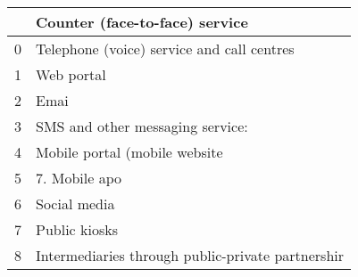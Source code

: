 \begin{tabular}{ll}
\toprule
{} &                     Counter (face-to-face) service \\
\midrule
0 &         Telephone (voice) service and call centres \\
1 &                                         Web portal \\
2 &                                               Emai \\
3 &                   SMS and other messaging service: \\
4 &                      Mobile portal (mobile website \\
5 &                                      7. Mobile apo \\
6 &                                       Social media \\
7 &                                      Public kiosks \\
8 &  Intermediaries through public-private partnershir \\
\bottomrule
\end{tabular}
